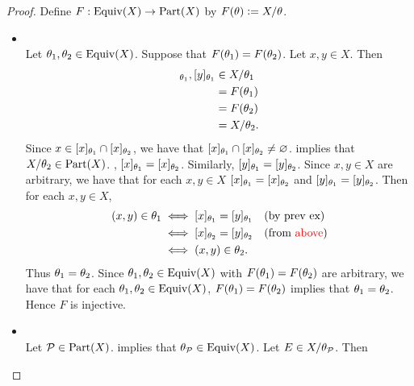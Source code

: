 \documentclass{book}
\begin{document}
	\begin{proof}
		Define $F: \operatorname*{\text{Equiv}}(X) \rightarrow \text{Part}(X)$ by $F(\theta) \vcentcolon= X/\theta$. 
		\begin{itemize}
			\item {} \\
			Let $\theta_1, \theta_2 \in \operatorname*{\text{Equiv}}(X)$. Suppose that $F(\theta_1) = F(\theta_2)$. Let $x,y \in X$. Then 
			\begin{align*}
				[x]_{\th_1},[y]_{\th_1} 
				& \in X/\th_1 \\
				& = F(\th_1) \\
				& = F(\th_2) \\
				& = X/\th_2. 
			\end{align*}
			Since $x \in [x]_{\theta_1} \cap [x]_{\theta_2}$, we have that $[x]_{\theta_1} \cap [x]_{\theta_2} \neq \varnothing$.  implies that $X/\theta_2 \in \text{Part}(X)$. , $[x]_{\theta_1} = [x]_{\theta_2}$. Similarly, $[y]_{\theta_1} = [y]_{\theta_2}$. Since $x,y \in X$ are arbitrary, we have that for each $x,y \in X$ $[x]_{\theta_1} = [x]_{\theta_2}$ and $[y]_{\theta_1} = [y]_{\theta_2}$. Then for each $x,y \in X$,
			\begin{align*}
				(x,y) \in \theta_1
				& \iff [x]_{\theta_1} = [y]_{\theta_1} \quad \text{(by prev ex)}\\
				& \iff [x]_{\theta_2} = [y]_{\theta_2} \quad \text{(from \textcolor{red}{above})} \\
				& \iff (x,y) \in \theta_2.
			\end{align*}
			Thus $\theta_1 = \theta_2$. Since $\theta_1, \theta_2 \in \operatorname*{\text{Equiv}}(X)$ with $F(\theta_1) = F(\theta_2)$ are arbitrary, we have that for each $\theta_1, \theta_2 \in \operatorname*{\text{Equiv}}(X)$, $F(\theta_1) = F(\theta_2)$ implies that $\theta_1 = \theta_2$. Hence $F$ is injective.
			\item {} \\
			Let $\mathcal{P} \in \text{Part}(X)$.  implies that $\theta_{\mathcal{P}} \in \operatorname*{\text{Equiv}}(X)$. Let $E \in X/\theta_{\mathcal{P}}$. Then  
		\end{itemize}      
	\end{proof}
	
	
	
	
	
	
	
	
	
	
	
	
	
	
	
	
	
	
	
	
	
	
	
\end{document}

